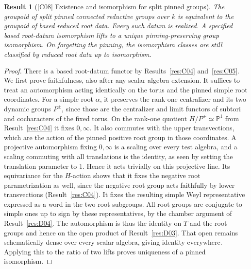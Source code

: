 \documentclass[11pt,a4paper,openany,oneside]{book}
\theoremstyle{resultstyle}
\newtheorem{statement}{Result}[chapter]
\newenvironment{result}[2]{\clubpenalty=10000\begin{statement}[\textnormal{[#1]} #2]\leavevmode\label{res:#1}\ignorespaces}{\end{statement}}
\theoremstyle{definition}
\numberwithin{equation}{chapter}
\begin{document}
\begin{result}{C08}{Existence and isomorphism for split pinned groups}
The groupoid of split pinned connected reductive groups over \(k\) is equivalent to the groupoid of based reduced root data. Every such datum is realized. A specified based root-datum isomorphism lifts to a unique pinning-preserving group isomorphism. On forgetting the pinning, the isomorphism classes are still classified by reduced root data up to isomorphism.
\end{result}

\begin{proof}
There is a based root-datum functor by Results~\ref{res:C04}
and~\ref{res:C05}. We first prove faithfulness, also after
any scalar algebra extension. It suffices to treat an
automorphism acting identically on the torus and the pinned
simple root coordinates. For a simple root \(\alpha\), it
preserves the rank-one centralizer and its two dynamic groups
\(P^\pm\), since those are the centralizer and limit functors
of subtori and cocharacters of the fixed torus.
On the rank-one quotient \(H/P^+\simeq\mathbb P^1\)
from Result~\ref{res:C04} it fixes \(0,\infty\).
It also commutes with the upper transvections, which are the
action of the pinned positive root group in those coordinates.
A projective automorphism fixing \(0,\infty\) is a scaling
over every test algebra, and a scaling commuting with all
translations is the identity, as seen by setting the translation
parameter to \(1\). Hence it acts trivially on this projective
line. Its equivariance for the \(H\)-action shows that it fixes
the negative root parametrization as well, since the negative
root group acts faithfully by lower transvections
(Result~\ref{res:C04}). It fixes the resulting simple
Weyl representative expressed as a word in the two root
subgroups. All root groups are conjugate to simple ones
up to sign by these representatives, by the chamber argument
of Result~\ref{res:D04}. The automorphism is thus the
identity on \(T\) and the root groups and hence on the open
product of Result~\ref{res:D03}. That open remains
schematically dense over every scalar algebra, giving
identity everywhere. Applying this to the ratio of two lifts
proves uniqueness of a pinned isomorphism.


\end{proof}
\end{document}
